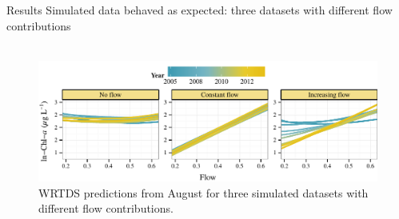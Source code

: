 \documentclass[serif]{beamer}\usepackage[]{graphicx}\usepackage[]{color}
\makeatletter
\def\maxwidth{ %
  \ifdim\Gin@nat@width>\linewidth
    \linewidth
  \else
    \Gin@nat@width
  \fi
}
\newenvironment{knitrout}{}{} %
\makeatother
\begin{document}
\begin{frame}{Results}
Simulated data behaved as expected: three datasets with different flow contributions \\~\\
\begin{knitrout}
\color{fgcolor}\begin{figure}[!ht]

{\centering \includegraphics[width=\maxwidth]{figs/unnamed-chunk-8-1} 

}

\caption[WRTDS predictions from August for three simulated datasets with different flow contributions]{WRTDS predictions from August for three simulated datasets with different flow contributions.}\label{fig:unnamed-chunk-8}
\end{figure}


\end{knitrout}
\end{frame}
\end{document}
